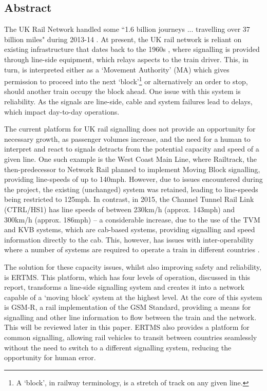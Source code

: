 \documentclass[twoside,11pt,a4paper]{article}
\begin{document}
\subsection{Abstract}
The UK Rail Network handled some ``1.6 billion journeys ... travelling over 37 billion miles" during 2013-14 \citep{RailExecutive14a}. At present, the UK rail network is reliant on existing infrastructure that dates back to the 1960s \citep{NetworkRail12a}, where signalling is provided through line-side equipment, which relays aspects to the train driver. This, in turn, is interpreted either as a `Movement Authority' (MA) which gives permission to proceed into the next `block'\footnote{A `block', in railway terminology, is a stretch of track on any given line.} or alternatively an order to stop, should another train occupy the block ahead. One issue with this system is reliability. As the signals are line-side, cable and system failures lead to delays, which impact day-to-day operations.

The current platform for UK rail signalling does not provide an opportunity for necessary growth, as passenger volumes increase, and the need for a human to interpret and react to signals detracts from the potential capacity and speed of a given line. One such example is the West Coast Main Line, where Railtrack, the then-predecessor to Network Rail planned to implement Moving Block signalling, providing line-speeds of up to 140mph. However, due to issues encountered during the project, the existing (unchanged) system was retained, leading to line-speeds being restricted to 125mph. In contrast, in 2015, the Channel Tunnel Rail Link (CTRL/HS1) has line speeds of between 230km/h (approx. 143mph) and 300km/h (approx. 186mph)\citep{RailTech15} -- a considerable increase, due to the use of the TVM and KVB systems, which are cab-based systems, providing signalling and speed information directly to the cab. This, however, has issues with inter-operability where a number of systems are required to operate a train in different countries \citep{IRJ14a}.

The solution for these capacity issues, whilst also improving safety and reliability, is ERTMS. This platform, which has four levels of operation, discussed in this report, transforms a line-side signalling system and creates it into a network capable of a `moving block' system at the highest level. At the core of this system is GSM-R, a rail implementation of the GSM Standard, providing a means for signalling and other line information to flow between the train and the network. This will be reviewed later in this paper. ERTMS also provides a platform for common signalling, allowing rail vehicles to transit between countries seamlessly without the need to switch to a different signalling system, reducing the opportunity for human error.
\end{document}
